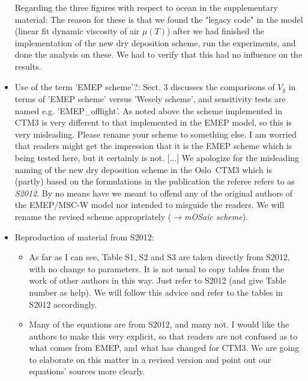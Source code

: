 \documentclass{scrartcl}
\begin{document}
\begin{itemize}
  Regarding the three figures with respect to ocean in the supplementary material: The reason for these is that we found the "legacy code" in the model (linear fit dynamic viscosity of air $\mu(T)$) after we had finished the implementation of the new dry deposition scheme, run the experiments, and done the analysis on these. We had to verify that this had no influence on the results. 
  
\item {\color{blue} Use of the term 'EMEP scheme'?: Sect. 3 discusses the comparisons of $V_g$ in terms of ’EMEP scheme’ versus
  ’Wesely scheme’, and sensitivity tests are named e.g. ’EMEP\_offlight’. As noted above
the scheme implemented in CTM3 is very different to that implemented in the EMEP
model, so this is very misleading. Please rename your scheme to something else.
I am worried that readers might get the impression that it is the EMEP scheme which
is being tested here, but it certainly is not. [...]}
  We apologize for the misleading naming of the new dry deposition scheme in the Oslo~CTM3 which is (partly) based on the formulations in the publication the referee refers to as \emph{S2012}. By no means have we meant to offend any of the original authors of the EMEP/MSC-W model nor intended to misguide the readers. We will rename the revised scheme appropriately ($\rightarrow$\emph{mOSaic scheme}). 
\item {\color{blue} Reproduction of material from S2012:}
  \begin{itemize}
  \item {\color{blue} As far as I can see, Table S1, S2 and S3 are taken directly from S2012, with no change to parameters. It is not usual to copy tables from the work of other authors in this way.
    Just refer to S2012 (and give Table number as help).}
    We will follow this advice and refer to the tables in S2012 accordingly.
  \item {\color{blue} Many of the equations are from S2012, and many not. I would like the authors to
    make this very explicit, so that readers are not confused as to what comes from EMEP,
    and what has changed for CTM3.}
    We are going to elaborate on this matter in a revised version and point out our equations' sources more clearly.
  \end{itemize}
\end{itemize}
\end{document}
